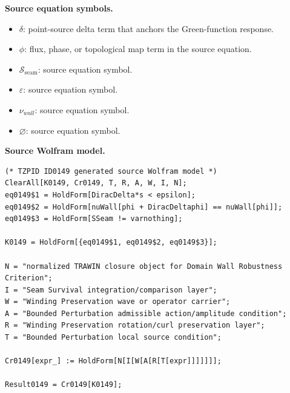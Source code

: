 \begin{minipage}[t]{0.49\linewidth}
\begingroup
\small
\raggedright
\textbf{Source equation symbols.}\par
\begin{itemize}[leftmargin=1.35em,itemsep=1pt,topsep=1pt,parsep=0pt]
    \item $\delta$: point-source delta term that anchors the Green-function response.
    \item $\phi$: flux, phase, or topological map term in the source equation.
    \item $\mathcal{S}_{\mathrm{seam}}$: source equation symbol.
    \item $\varepsilon$: source equation symbol.
    \item $\nu_{wall}$: source equation symbol.
    \item $\varnothing$: source equation symbol.
\end{itemize}
\endgroup
\end{minipage}\hfill
\begin{minipage}[t]{0.47\linewidth}
\begingroup
\scriptsize
\raggedright
\textbf{Source Wolfram model.}\par
\begin{Verbatim}[fontsize=\tiny,breaklines=true,breakanywhere=true]
(* TZPID ID0149 generated source Wolfram model *)
ClearAll[K0149, Cr0149, T, R, A, W, I, N];
eq0149$1 = HoldForm[DiracDelta*s < epsilon];
eq0149$2 = HoldForm[nuWall[phi + DiracDeltaphi] == nuWall[phi]];
eq0149$3 = HoldForm[SSeam != varnothing];

K0149 = HoldForm[{eq0149$1, eq0149$2, eq0149$3}];

N = "normalized TRAWIN closure object for Domain Wall Robustness Criterion";
I = "Seam Survival integration/comparison layer";
W = "Winding Preservation wave or operator carrier";
A = "Bounded Perturbation admissible action/amplitude condition";
R = "Winding Preservation rotation/curl preservation layer";
T = "Bounded Perturbation local source condition";

Cr0149[expr_] := HoldForm[N[I[W[A[R[T[expr]]]]]]];

Result0149 = Cr0149[K0149];
\end{Verbatim}
\endgroup
\end{minipage}


